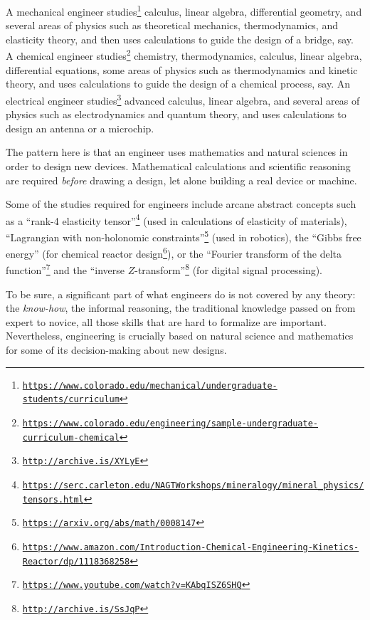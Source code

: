 A mechanical engineer studies\footnote{\texttt{\href{https://www.colorado.edu/mechanical/undergraduate-students/curriculum}{https://www.colorado.edu/mechanical/undergraduate-students/curriculum}}}
calculus, linear algebra, differential geometry, and several areas
of physics such as theoretical mechanics, thermodynamics, and elasticity
theory, and then uses calculations to guide the design of a bridge,
say. A chemical engineer studies\footnote{\texttt{\href{https://www.colorado.edu/engineering/sample-undergraduate-curriculum-chemical}{https://www.colorado.edu/engineering/sample-undergraduate-curriculum-chemical}}}
chemistry, thermodynamics, calculus, linear algebra, differential
equations, some areas of physics such as thermodynamics and kinetic
theory, and uses calculations to guide the design of a chemical process,
say. An electrical engineer studies\footnote{\texttt{\href{http://archive.is/XYLyE}{http://archive.is/XYLyE}}}
advanced calculus, linear algebra, and several areas of physics such
as electrodynamics and quantum theory, and uses calculations to design
an antenna or a microchip.

The pattern here is that an engineer uses mathematics and natural
sciences in order to design new devices. Mathematical calculations
and scientific reasoning are required \emph{before} drawing a design,
let alone building a real device or machine.

Some of the studies required for engineers include arcane abstract
concepts such as a ``rank-4 elasticity tensor''\footnote{\texttt{\href{https://serc.carleton.edu/NAGTWorkshops/mineralogy/mineral_physics/tensors.html}{https://serc.carleton.edu/NAGTWorkshops/mineralogy/mineral\_physics/tensors.html}}}
(used in calculations of elasticity of materials), ``Lagrangian with
non-holonomic constraints''\footnote{\texttt{\href{https://arxiv.org/abs/math/0008147}{https://arxiv.org/abs/math/0008147}}}
(used in robotics), the ``Gibbs free energy'' (for chemical reactor
design\footnote{\texttt{\href{https://www.amazon.com/Introduction-Chemical-Engineering-Kinetics-Reactor/dp/1118368258}{https://www.amazon.com/Introduction-Chemical-Engineering-Kinetics-Reactor/dp/1118368258}}}),
or the ``Fourier transform of the delta function''\footnote{\texttt{\href{https://www.youtube.com/watch?v=KAbqISZ6SHQ}{https://www.youtube.com/watch?v=KAbqISZ6SHQ}}}
and the ``inverse $Z$-transform''\footnote{\texttt{\href{http://archive.is/SsJqP}{http://archive.is/SsJqP}}}
(for digital signal processing).

To be sure, a significant part of what engineers do is not covered
by any theory: the \emph{know-how}, the informal reasoning, the traditional
knowledge passed on from expert to novice,  \textemdash{} all those
skills that are hard to formalize are important. Nevertheless, engineering
is crucially based on natural science and mathematics for some of
its decision-making about new designs.


